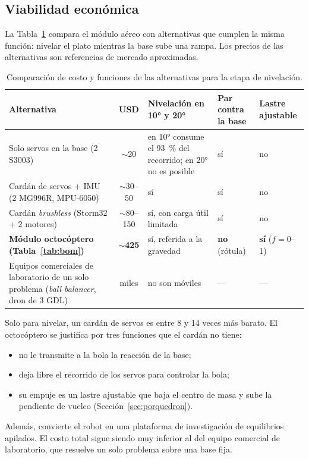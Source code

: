 \subsection{Viabilidad económica}
\label{sec:costos}
La Tabla~\ref{tab:costos} compara el módulo aéreo con alternativas que cumplen la misma función: nivelar el plato mientras la base sube una rampa. Los precios de las alternativas son referencias de mercado aproximadas.

\begin{table}[!htbp]
\centering
\small
\caption{Comparación de costo y funciones de las alternativas para la etapa de nivelación.}
\label{tab:costos}
\begin{tabularx}{\textwidth}{@{}>{\raggedright\arraybackslash}p{}c>{\raggedright\arraybackslash}X>{\raggedright\arraybackslash}p{}>{\raggedright\arraybackslash}p{}@{}}
\toprule
Alternativa & USD & Nivelación en 10° y 20° & Par contra la base & Lastre ajustable \\
\midrule
Solo servos en la base (2 S3003) & $\sim$20 & en 10° consume el \SI{93}{\percent} del recorrido; en 20° no es posible & sí & no \\
Cardán de servos + IMU (2 MG996R, MPU-6050) & $\sim$30--50 & sí & sí & no \\
Cardán \emph{brushless} (Storm32 + 2 motores) & $\sim$80--150 & sí, con carga útil limitada & sí & no \\
\textbf{Módulo octocóptero (Tabla~\ref{tab:bom})} & $\sim$\textbf{425} & sí, referida a la gravedad & \textbf{no} (rótula) & \textbf{sí} ($f=0$--1) \\
Equipos comerciales de laboratorio de un solo problema (\emph{ball balancer}, dron de 3 GDL) & miles & no son móviles & --- & --- \\
\bottomrule
\end{tabularx}
\end{table}

Solo para nivelar, un cardán de servos es entre 8 y 14 veces más barato. El octocóptero se justifica por tres funciones que el cardán no tiene:
\begin{itemize}
  \item no le transmite a la bola la reacción de la base;
  \item deja libre el recorrido de los servos para controlar la bola;
  \item su empuje es un lastre ajustable que baja el centro de masa y sube la pendiente de vuelco (Sección~\ref{sec:porquedron}).
\end{itemize}
Además, convierte el robot en una plataforma de investigación de equilibrios apilados. El costo total sigue siendo muy inferior al del equipo comercial de laboratorio, que resuelve un solo problema sobre una base fija.
